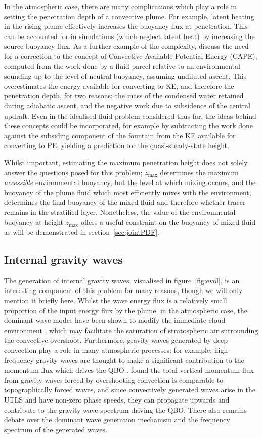 \documentclass[a4paper]{article}
\begin{document}
In the atmospheric case, there are many complications which play a role in setting the penetration depth
of a convective plume. For example, latent heating in the rising plume effectively increases the buoyancy
flux at penetration. This can be accounted for in simulations (which neglect latent heat) by increasing the
source buoyancy flux. As a further example of the complexity, \citet{tailleux2004} discuss the need for a
correction to the concept of Convective Available Potential Energy (CAPE), computed from the work done by a
fluid parcel relative to an environmental sounding up to the level of neutral buoyancy, assuming undiluted
ascent. This overestimates the energy available for converting to KE, and therefore the penetration depth, for
two reasons: the mass of the condensed water retained during adiabatic ascent, and the negative work due to
subsidence of the central updraft. Even in the idealised fluid problem considered thus far, the ideas behind
these concepts could be incorporated, for example by subtracting the work done against the subsiding component
of the fountain from the KE available for converting to PE, yielding a prediction for the quasi-steady-state
height.

Whilst important, estimating the maximum penetration height does not solely answer the questions posed for
this problem; $z_{\max}$ determines the maximum \emph{accessible} environmental buoyancy, but the level at
which mixing occurs, and the buoyancy of the plume fluid which most efficiently mixes with the environment,
determines the final buoyancy of the mixed fluid and therefore whether tracer remains in the stratified layer.
Nonetheless, the value of the environmental buoyancy at height $z_{\max}$ offers a useful constraint on the
buoyancy of mixed fluid as will be demonstrated in section~\ref{sec:jointPDF}.

\subsection{Internal gravity waves}

The generation of internal gravity waves, visualised in figure~\ref{fig:evol}, is an interesting
component of this problem for many reasons, though we will only mention it briefly here. Whilst the wave
energy flux is a relatively small proportion of the input energy flux by the plume, in the atmospheric case,
the dominant wave modes have been shown to modify the immediate cloud environment \citep{lane2001}, which may
facilitate the saturation of stratospheric air surrounding the convective overshoot. Furthermore, gravity
waves generated by deep convection play a role in many atmospheric processes; for example, high frequency
gravity waves are thought to make a significant contribution to the momentum flux which drives the QBO
\citep{baldwin2001}. \citet{flynn2004} found the total vertical momentum flux from gravity waves forced by
overshooting convection is comparable to topographically forced waves, and since convectively generated
waves arise in the UTLS and have non-zero phase speeds, they can propagate upwards and contribute to the
gravity wave spectrum driving the QBO. There also remains debate over the dominant wave generation mechanism
and the frequency spectrum of the generated waves. 
\end{document}

